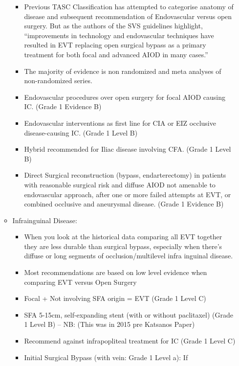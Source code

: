 \documentclass[
]{book}
\begin{document}
\begin{itemize}
\begin{itemize}
    \begin{itemize}
    \item
      Previous TASC Classification has attempted to categorise
      anatomy of disease and subsequent recommendation of
      Endovascular versus open surgery. But as the authors of the
      SVS guidelines highlight, ``improvements in technology and
      endovascular techniques have resulted in EVT replacing open
      surgical bypass as a primary treatment for both focal and
      advanced AIOD in many cases.''
    \item
      The majority of evidence is non randomized and meta analyses
      of non-randomized series.
    \item
      Endovascular procedures over open surgery for focal AIOD
      causing IC. (Grade 1 Evidence B)
    \item
      Endovascular interventions as first line for CIA or EIZ
      occlusive disease-causing IC. (Grade 1 Level B)
    \item
      Hybrid recommended for Iliac disease involving CFA. (Grade 1
      Level B)
    \item
      Direct Surgical reconstruction (bypass, endarterectomy) in
      patients with reasonable surgical risk and diffuse AIOD not
      amenable to endovascular approach, after one or more failed
      attempts at EVT, or combined occlusive and aneurysmal
      disease. (Grade 1 Evidence B)
    \end{itemize}
  \item
    Infrainguinal Disease:

    \begin{itemize}
    \item
      When you look at the historical data comparing all EVT
      together they are less durable than surgical bypass,
      especially when there's diffuse or long segments of
      occlusion/multilevel infra inguinal disease.
    \item
      Most recommendations are based on low level evidence when
      comparing EVT versus Open Surgery
    \item
      Focal + Not involving SFA origin = EVT (Grade 1 Level C)
    \item
      SFA 5-15cm, self-expanding stent (with or without
      paclitaxel) (Grade 1 Level B) -- NB: (This was in 2015 pre
      Katsanos Paper)
    \item
      Recommend against infrapopliteal treatment for IC (Grade 1
      Level C)
    \item
      Initial Surgical Bypass (with vein: Grade 1 Level a): If


\end{itemize}
\end{itemize}
\end{itemize}
\end{document}
